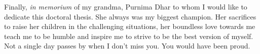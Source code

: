 \vspace{1cm}
Finally, \emph{in memorium} of my grandma, Purnima Dhar to whom I would like to dedicate this doctoral thesis. She always was my biggest champion. Her sacrifices to raise her children in the challenging  situations, her boundless love towards me teach me to be humble and inspire me to strive to be the best version of myself. Not a single day passes by when I don't miss you. You would have been proud.


\endgroup
